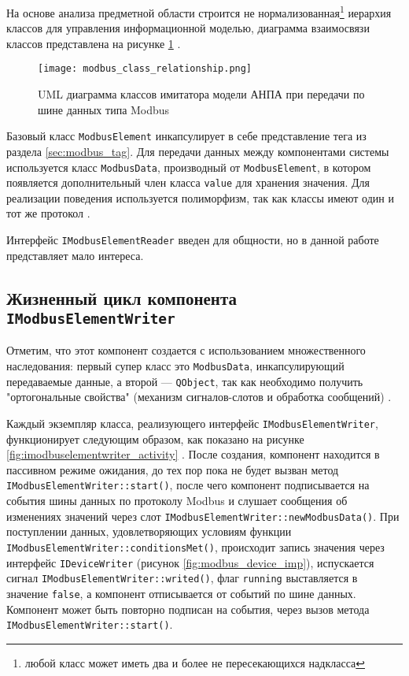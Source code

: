 На основе анализа предметной области строится не нормализованная\footnote{любой класс может иметь два и более не пересекающихся надкласса}
иерархия классов для управления информационной моделью,
диаграмма взаимосвязи классов представлена на рисунке \ref{fig:modbus_class_uml} \cite[стр. 223]{book:oop:oop_analize}.
\begin{landscape}
    \begin{center}
        \begin{figure}[ht!]
            \texttt{[image: modbus\_class\_relationship.png]}
            \caption{UML диаграмма классов имитатора модели АНПА при передачи по шине данных типа Modbus}\label{fig:modbus_class_uml}
        \end{figure}
    \end{center}
\end{landscape}
Базовый класс \texttt{ModbusElement} инкапсулирует в себе представление тега из раздела \ref{sec:modbus_tag}.
Для передачи данных между компонентами системы используется класс \texttt{ModbusData}, производный от \texttt{ModbusElement},
в котором появляется дополнительный член класса \texttt{value} для хранения значения.
Для реализации поведения используется полиморфизм, так как классы имеют один и тот же протокол \cite[стр. 133]{book:oop:oop_analize}.



Интерфейс \texttt{IModbusElementReader} введен для общности,
но в данной работе представляет мало интереса.


\subsection{Жизненный цикл компонента \texttt{IModbusElementWriter}}
Отметим, что этот компонент создается с использованием множественного наследования:
первый супер класс это \texttt{ModbusData}, инкапсулирующий передаваемые данные,
а второй --- \texttt{QObject}, так как необходимо получить "ортогональные свойства"
(механизм сигналов-слотов и обработка сообщений) \cite[стр. 134]{book:oop:oop_analize}.

Каждый экземпляр класса, реализующего интерфейс \texttt{IModbusElementWri\-ter},
функционирует следующим образом, как показано на рисунке \ref{fig:imodbuselementwriter_activity} \cite[стр. 217]{book:oop:oop_analize}.
После создания, компонент находится в пассивном режиме ожидания, до тех пор пока не будет вызван
метод \texttt{IModbusElementWriter::start()}, после чего компонент подписывается на события шины данных по протоколу Modbus
и слушает сообщения об изменениях значений через слот \texttt{IModbusElementWriter::newModbusData()}.
При поступлении данных, удовлетворяющих условиям функции \texttt{IModbusElementWriter::conditionsMet()},
происходит запись значения через интерфейс \texttt{IDeviceWriter} (рисунок \ref{fig:modbus_device_imp}),
испускается сигнал \texttt{IModbusElementWriter::writed()},
флаг \texttt{running} выставляется в значение \texttt{false},
а компонент отписывается от событий по шине данных.
Компонент может быть повторно подписан на события, через вызов метода \texttt{IModbusElementWriter::start()}.

